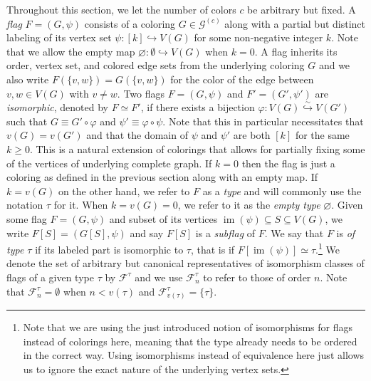 \documentclass[a4paper,11pt]{article}
\numberwithin{equation}{section}
\newcommand{\mF}{\mathcal{F}}
\newcommand{\mG}{\mathcal{G}}
\begin{document}
Throughout this section, we let the number of colors $c$ be arbitrary but fixed. A \emph{flag} $F = (G, \psi)$ consists of a coloring $G \in \mG^{(c)}$ along with a partial but distinct labeling of its vertex set  $\psi: [k] \hookrightarrow V(G)$ for some non-negative integer $k$. Note that we allow the empty map $\varnothing: \emptyset \hookrightarrow V(G)$ when $k = 0$. A flag inherits its order, vertex set, and colored edge sets from the underlying coloring $G$ and we also write $F(\{v,w\}) = G(\{v, w\})$ for the color of the edge between $v, w \in V(G)$ with $v \neq w$. Two flags $F = (G, \psi)$ and $F' = (G', \psi')$ are \emph{isomorphic}, denoted by $F \simeq F'$, if there exists a bijection $\varphi: V(G) \overset{\sim}{\hookrightarrow} V(G')$ such that $G \equiv G' \circ \varphi$ and $\psi' \equiv \varphi \circ \psi$. Note that this in particular necessitates that $v(G) = v(G')$ and that the domain of $\psi$ and $\psi'$ are both $[k]$ for the same $k \geq 0$. This is a natural extension of colorings that allows for partially fixing some of the vertices of underlying complete graph. If $k = 0$ then the flag is just a coloring as defined in the previous section along with an empty map. If $k = v(G)$ on the other hand, we refer to $F$ as a \emph{type} and will commonly use the notation $\tau$ for it. When $k = v(G) = 0$, we refer to it as the \emph{empty type} $\varnothing$. Given some flag $F = (G, \psi)$ and subset of its vertices $\operatorname{im} (\psi) \subseteq S \subseteq V(G)$, we write $F[S] = (G[S], \psi)$ and say $F[S]$ is  a \emph{subflag} of $F$. We say that $F$ is \emph{of type $\tau$} if its labeled part is isomorphic to $\tau$, that is if $F[\operatorname{im} (\psi)] \simeq \tau$.\footnote{Note that we are using the just introduced notion of isomorphisms for flags instead of colorings here, meaning that the type already needs to be ordered in the correct way. Using isomorphisms instead of equivalence here just allows us to ignore the exact nature of the underlying vertex sets.} We denote the set of arbitrary but canonical representatives of isomorphism classes of flags of a given type $\tau$ by $\mF^\tau$ and we use $\mF^\tau_n$ to refer to those of order $n$. Note that $\mF^\tau_n = \emptyset$ when $n < v(\tau)$ and $\mF^\tau_{v(\tau)} = \{\tau\}$.
\end{document}
